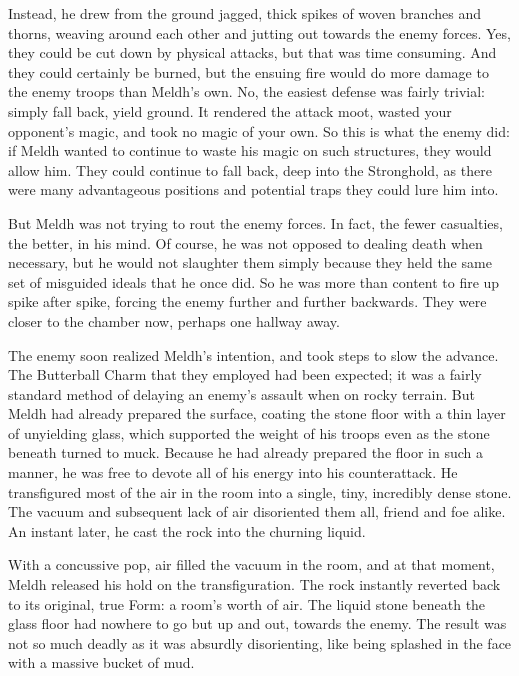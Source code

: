 Instead, he drew from the ground jagged, thick spikes of woven branches and thorns, weaving around each other and jutting out towards the enemy forces. Yes, they could be cut down by physical attacks, but that was time consuming. And they could certainly be burned, but the ensuing fire would do more damage to the enemy troops than Meldh’s own. No, the easiest defense was fairly trivial: simply fall back, yield ground. It rendered the attack moot, wasted your opponent’s magic, and took no magic of your own. So this is what the enemy did: if Meldh wanted to continue to waste his magic on such structures, they would allow him. They could continue to fall back, deep into the Stronghold, as there were many advantageous positions and potential traps they could lure him into.

But Meldh was not trying to rout the enemy forces. In fact, the fewer casualties, the better, in his mind. Of course, he was not opposed to dealing death when necessary, but he would not slaughter them simply because they held the same set of misguided ideals that he once did. So he was more than content to fire up spike after spike, forcing the enemy further and further backwards. They were closer to the chamber now, perhaps one hallway away.

The enemy soon realized Meldh’s intention, and took steps to slow the advance. The Butterball Charm that they employed had been expected; it was a fairly standard method of delaying an enemy’s assault when on rocky terrain. But Meldh had already prepared the surface, coating the stone floor with a thin layer of unyielding glass, which supported the weight of his troops even as the stone beneath turned to muck.
\SmallVSpace
Because he had already prepared the floor in such a manner, he was free to devote all of his energy into his counterattack. He transfigured most of the air in the room into a single, tiny, incredibly dense stone. The vacuum and subsequent lack of air disoriented them all, friend and foe alike. An instant later, he cast the rock into the churning liquid.

With a concussive pop, air filled the vacuum in the room, and at that moment, Meldh released his hold on the transfiguration. The rock instantly reverted back to its original, true Form: a room’s worth of air. The liquid stone beneath the glass floor had nowhere to go but up and out, towards the enemy. The result was not so much deadly as it was absurdly disorienting, like being splashed in the face with a massive bucket of mud.

